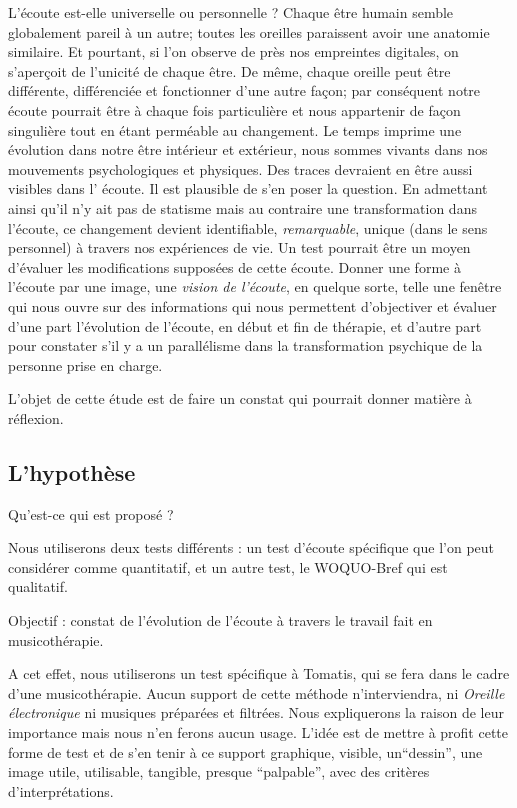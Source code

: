 L'écoute est-elle universelle ou personnelle ?
 Chaque être humain semble  globalement pareil à un autre; toutes les oreilles paraissent  avoir une anatomie similaire. Et pourtant, si l'on observe de près nos empreintes digitales, on s'aperçoit de l'unicité de chaque être. De même, chaque oreille peut être différente, différenciée et  fonctionner d'une autre façon;  par conséquent notre  écoute pourrait être à chaque fois particulière et nous appartenir de façon singulière tout en étant perméable au changement.
Le temps imprime une évolution dans notre être intérieur et extérieur, nous sommes vivants dans nos mouvements psychologiques et physiques. Des traces devraient en être aussi visibles dans l' écoute. Il est plausible de s'en poser la question.
En admettant ainsi qu'il n'y ait pas de statisme mais au contraire une transformation dans l'écoute, ce changement devient identifiable, \textit{remarquable}, unique (dans le sens personnel) à travers nos expériences de vie.  Un test pourrait être un moyen d'évaluer les modifications supposées de cette écoute. 
Donner une forme à l'écoute par une image, une \emph{vision de l'écoute}, en quelque sorte, telle une fenêtre qui nous ouvre sur des informations qui nous permettent d'objectiver et évaluer d'une part 
 l'évolution de l'écoute, en début et fin de thérapie, et d'autre part pour constater s'il y a un parallélisme dans la transformation psychique  de la personne prise en charge.

L'objet de cette étude est de faire un constat
qui pourrait donner matière à réflexion.


\subsection{L'hypothèse}

Qu'est-ce qui est proposé ? 
	
	Nous utiliserons deux tests différents : 
	un test d'écoute spécifique que l'on peut considérer comme quantitatif, 
	et un autre test, le WOQUO-Bref qui est qualitatif.
	
Objectif : constat de l'évolution de l'écoute à travers le travail fait en musicothérapie.

A cet effet, nous utiliserons un test spécifique à Tomatis, qui se fera dans le cadre d'une musicothérapie. Aucun support de cette méthode n'interviendra, ni \textsl{Oreille
	électronique} ni musiques préparées et filtrées. Nous expliquerons la raison de   leur importance mais nous n'en ferons aucun usage. L'idée est de mettre à profit cette forme de test et de  s'en tenir à ce support
graphique, visible, un``dessin'', une image utile, utilisable, tangible,
presque ``palpable'', avec des critères
d'interprétations.
	



